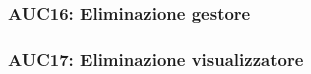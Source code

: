 \documentclass[../analisi-dei-requisiti.tex]{subfiles}
\begin{document}


\subsubsection{AUC16: Eliminazione gestore}%
\label{subs:AUC16}



\subsubsection{AUC17: Eliminazione visualizzatore}%
\label{subs:AUC17}


\end{document}
